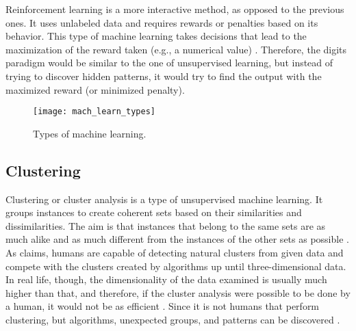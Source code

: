 Reinforcement learning is a more interactive method, as opposed to the previous ones. It uses unlabeled data and requires rewards or penalties based on its behavior. This type of machine learning takes decisions that lead to the maximization of the reward taken (e.g., a numerical value) \autocite[2-3]{rein}. Therefore, the digits paradigm would be similar to the one of unsupervised learning, but instead of trying to discover hidden patterns, it would try to find the output with the maximized reward (or minimized penalty). 

\begin{figure}
	\texttt{[image: mach\_learn\_types]}
	\caption{Types of machine learning.}
  	\label{fig:types}
\end{figure}

\subsection{Clustering}
Clustering or cluster analysis is a type of unsupervised machine learning. It groups instances to create coherent sets based on their similarities and dissimilarities. The aim is that instances that belong to the same sets are as much alike and as much different from the instances of the other sets as possible \autocite{dunham, tanSteinKum}. \\
As \textcite{kantar} claims, humans are capable of detecting natural clusters from given data and compete with the clusters created by algorithms up until three-dimensional data. In real life, though, the dimensionality of the data examined is usually much higher than that, and therefore, if the cluster analysis were possible to be done by a human, it would not be as efficient \autocite[250]{kantar}. Since it is not humans that perform clustering, but algorithms, unexpected groups, and patterns can be discovered \autocite[444]{han}.

